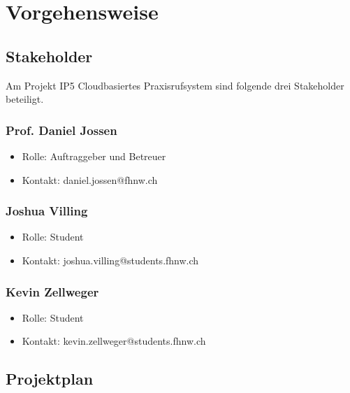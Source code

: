 \section{Vorgehensweise}

\subsection{Stakeholder}

    Am Projekt IP5 Cloudbasiertes Praxisrufsystem sind folgende drei Stakeholder beteiligt. 

    \subsubsection*{Prof. Daniel Jossen}

        \begin{itemize}
            \item Rolle: Auftraggeber und Betreuer
            \item Kontakt: daniel.jossen@fhnw.ch
        \end{itemize}

    \subsubsection*{Joshua Villing}

        \begin{itemize}
            \item Rolle: Student
            \item Kontakt: joshua.villing@students.fhnw.ch
        \end{itemize}

    \subsubsection*{Kevin Zellweger}

        \begin{itemize}
            \item Rolle: Student
            \item Kontakt: kevin.zellweger@students.fhnw.ch
        \end{itemize}
    
\clearpage

\subsection{Projektplan}

